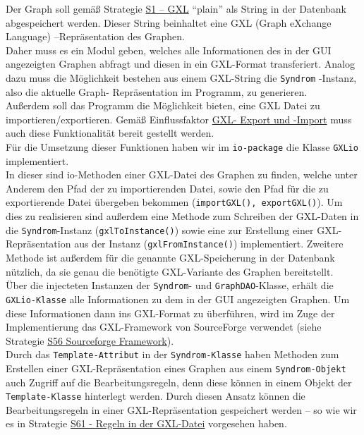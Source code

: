\documentclass[enabledeprecatedfontcommands,fontsize=11pt,paper=a4,twoside]{scrartcl}
\newcounter{one}
\begin{document}
Der Graph soll gemäß Strategie \hyperlink{yy}{S1 – GXL} "`plain"' als String in der Datenbank abgespeichert werden. Dieser String beinhaltet eine GXL (Graph eXchange Language) –Repräsentation des Graphen.\\
Daher muss es ein Modul geben, welches alle Informationen des in der GUI angezeigten Graphen abfragt und diesen in ein GXL-Format transferiert. Analog dazu muss die Möglichkeit bestehen aus einem GXL-String die \texttt{Syndrom} -Instanz, also die aktuelle Graph- Repräsentation im Programm, zu generieren.\\ 
Außerdem soll das Programm die Möglichkeit bieten, eine GXL Datei zu importieren/exportieren. Gemäß Einflussfaktor \hyperlink{ii}{GXL- Export und -Import} muss auch diese Funktionalität bereit gestellt werden.\\ 
Für die Umsetzung dieser Funktionen haben wir im \texttt{io-package} die Klasse \texttt{GXLio} implementiert. \\
In dieser sind io-Methoden einer GXL-Datei des Graphen zu finden, welche unter Anderem den Pfad der zu importierenden Datei, sowie den Pfad für die zu exportierende Datei übergeben bekommen (\texttt{importGXL(), exportGXL()}). Um dies zu realisieren sind außerdem eine Methode zum Schreiben der GXL-Daten in die \texttt{Syndrom}-Instanz (\texttt{gxlToInstance()}) sowie eine zur Erstellung einer GXL-Repräsentation aus der Instanz (\texttt{gxlFromInstance()}) implementiert. Zweitere Methode ist außerdem für die genannte GXL-Speicherung in der Datenbank nützlich, da sie genau die benötigte GXL-Variante des Graphen bereitstellt.\\ 
Über die injecteten Instanzen der \texttt{Syndrom}- und \texttt{GraphDAO}-Klasse, erhält die \texttt{GXLio-Klasse} alle Informationen zu dem in der GUI angezeigten Graphen. 
Um diese Informationen dann ins GXL-Format zu überführen, wird im Zuge der Implementierung das GXL-Framework von SourceForge verwendet (siehe Strategie \hyperlink{xaa}{S56 Sourceforge Framework}).\\
Durch das \texttt{Template-Attribut} in der \texttt{Syndrom-Klasse} haben Methoden zum Erstellen einer GXL-Repräsentation eines Graphen aus einem \texttt{Syndrom-Objekt} auch Zugriff auf die Bearbeitungsregeln, denn diese können in einem Objekt der \texttt{Template-Klasse} hinterlegt werden. Durch diesen Ansatz können die Bearbeitungsregeln in einer GXL-Repräsentation gespeichert werden – so wie wir es in Strategie \hyperlink{vvv}{S61 - Regeln in der GXL-Datei} vorgesehen haben. \\ 
\end{document}
